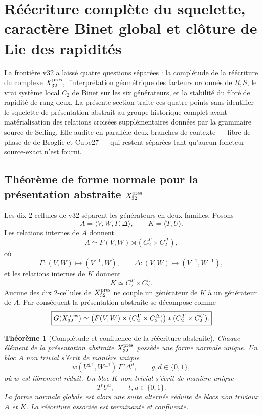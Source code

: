 \documentclass[11pt,a4paper]{article}
\newtheorem{theorem}{Théorème}[section]
\begin{document}
\section{Réécriture complète du squelette, caractère Binet global et clôture de Lie des rapidités}\label{sec:v33-rewrite-binet-lie}

La frontière v32 a laissé quatre questions séparées : la complétude de la réécriture du complexe
$X_{32}^{\rm pres}$, l'interprétation géométrique des facteurs ordonnés de $R,S$, le vrai système
local $C_2$ de Binet sur les six générateurs, et la stabilité du fibré de rapidité de rang deux.
La présente section traite ces quatre points sans identifier le squelette de présentation abstrait au
groupe historique complet avant matérialisation des relations croisées supplémentaires données par
la grammaire source de Selling. Elle audite en parallèle deux branches de contexte --- fibre de phase
de de Broglie et Cube27 --- qui restent séparées tant qu'aucun foncteur source-exact n'est fourni.

\subsection{Théorème de forme normale pour la présentation abstraite \texorpdfstring{$X_{32}^{\rm pres}$}{X32 pres}}

Les dix $2$-cellules de v32 séparent les générateurs en deux familles. Posons
\[
 A=\langle V,W,\Gamma,\Delta\rangle,
 \qquad
 K=\langle T,U\rangle.
\]
Les relations internes de $A$ donnent
\[
 A\simeq F(V,W)\rtimes(C_2^{\Gamma}\times C_2^{\Delta}),
\]
où
\[
 \Gamma:(V,W)\mapsto(V^{-1},W),
 \qquad
 \Delta:(V,W)\mapsto(V^{-1},W^{-1}),
\]
et les relations internes de $K$ donnent
\[
 K\simeq C_2^T\times C_2^U.
\]
Aucune des dix $2$-cellules de $X_{32}^{\rm pres}$ ne couple un générateur de $K$ à un générateur
de $A$. Par conséquent la présentation abstraite se décompose comme
\begin{equation}\label{eq:v33-X32-free-product}
 \boxed{
 G(X_{32}^{\rm pres})
 \simeq
 \bigl(F(V,W)\rtimes(C_2^{\Gamma}\times C_2^{\Delta})\bigr)
 *
 (C_2^T\times C_2^U).}
\end{equation}

\begin{theorem}[Complétude et confluence de la réécriture abstraite]\label{thm:v33-X32-normal-form}
Chaque élément de la présentation abstraite $X_{32}^{\rm pres}$ possède une forme normale unique.
Un bloc $A$ non trivial s'écrit de manière unique
\[
 w(V^{\pm1},W^{\pm1})\,\Gamma^g\Delta^d,
 \qquad g,d\in\{0,1\},
\]
où $w$ est librement réduit. Un bloc $K$ non trivial s'écrit de manière unique
\[
 T^tU^u,
 \qquad t,u\in\{0,1\}.
\]
La forme normale globale est alors une suite alternée réduite de blocs non triviaux $A$ et $K$.
La réécriture associée est terminante et confluente.
\end{theorem}
\end{document}

